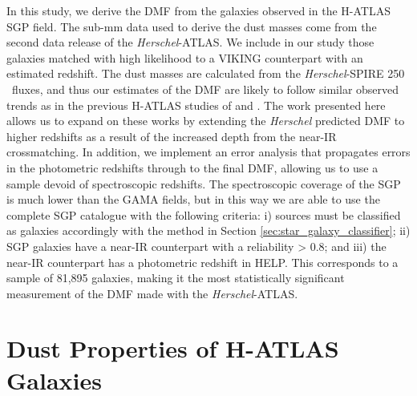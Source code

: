 In this study, we derive the DMF from the galaxies observed in the H-ATLAS SGP field. The sub-mm data used to derive the dust masses come from the second data release of the \textit{Herschel}-ATLAS. We include in our study those galaxies matched with high likelihood to a VIKING counterpart with an estimated redshift. The dust masses are calculated from the \textit{Herschel}-SPIRE 250\,\micron\ fluxes, and thus our estimates of the DMF are likely to follow similar observed trends as in the previous H-ATLAS studies of \citealt{Dunne_2011} and \citealt{Beeston_2018}. The work presented here allows us to expand on these works by extending the \textit{Herschel} predicted DMF to higher redshifts as a result of the increased depth from the near-IR crossmatching. In addition, we implement an error analysis that propagates errors in the photometric redshifts through to the final DMF, allowing us to use a sample devoid of spectroscopic redshifts. The spectroscopic coverage of the SGP is much lower than the GAMA fields, but in this way we are able to use the complete SGP catalogue with the following criteria: i) sources must be classified as galaxies accordingly with the method in Section \ref{sec:star_galaxy_classifier}; ii) SGP galaxies have a near-IR counterpart with a reliability > 0.8; and iii) the near-IR counterpart has a photometric redshift in HELP. This corresponds to a sample of 81,895 galaxies, making it the most statistically significant measurement of the DMF made with the \textit{Herschel}-ATLAS.

\section{Dust Properties of H-ATLAS Galaxies}

